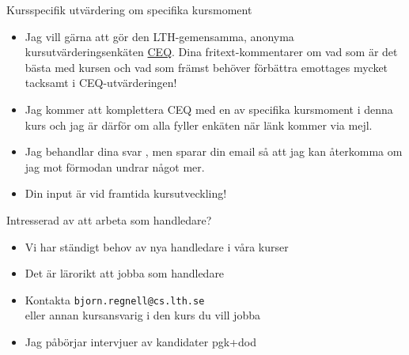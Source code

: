 \begin{Slide}{Kursspecifik utvärdering om specifika kursmoment}\SlideFontSmall
\begin{itemize}
\item Jag vill gärna att  gör den LTH-gemensamma, anonyma kursutvärderingsenkäten \href{https://www.ceq.lth.se/}{CEQ}. Dina fritext-kommentarer om vad som är det bästa med kursen och vad som främst behöver förbättra emottages mycket tacksamt i CEQ-utvärderingen!
\item Jag kommer att komplettera CEQ med en  av specifika kursmoment i denna kurs och jag är därför  om alla fyller enkäten när länk kommer via mejl.
\item Jag behandlar dina svar , men sparar din email så att jag kan återkomma om jag mot förmodan undrar något mer.
\item Din input är  vid framtida kursutveckling!
\end{itemize}
\end{Slide}

\begin{Slide}{Intresserad av att arbeta som handledare?}
\begin{itemize}
\item Vi har ständigt behov av nya handledare i våra kurser
\item Det är lärorikt att jobba som handledare
\item Kontakta \verb|bjorn.regnell@cs.lth.se| \\eller annan kursansvarig i den kurs du vill jobba
\item Jag påbörjar intervjuer av kandidater pgk+dod 
\end{itemize}

\end{Slide}


